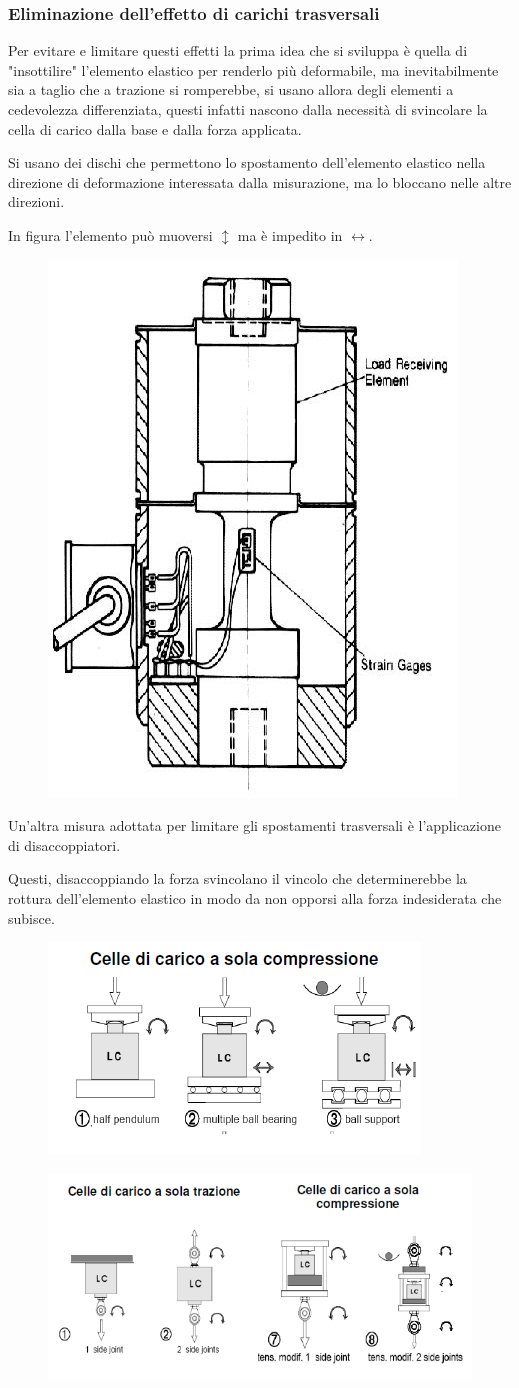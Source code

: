 \documentclass[a4paper, 15pt]{article}
\begin{document}
\subsubsection{Eliminazione dell'effetto di carichi trasversali}		
\begin{adjustwidth}{2in}{}	
	 	Per evitare e limitare questi effetti la prima idea che si sviluppa è quella di "insottilire" l'elemento elastico per renderlo più deformabile, ma inevitabilmente sia a taglio che a trazione si romperebbe, si usano allora degli elementi a cedevolezza differenziata, questi infatti nascono dalla necessità di svincolare la cella di carico dalla base e dalla forza applicata. \newline 
	 	
	 	Si usano dei dischi che permettono lo spostamento dell'elemento elastico nella direzione di deformazione interessata dalla misurazione, ma lo bloccano nelle altre direzioni. 
	 	
	 	In figura l'elemento può muoversi $\updownarrow$ ma è impedito in $\leftrightarrow$. 
\begin{figure}[H]
	\centering
	\includegraphics[width=0.2\linewidth]{immagini/10}
	\label{fig:10}
\end{figure}
\newpage
	 	Un'altra misura adottata per limitare gli spostamenti trasversali è l'applicazione di disaccoppiatori. 
	 	
	 	Questi, disaccoppiando la forza svincolano il vincolo che determinerebbe la rottura dell'elemento elastico in modo da non opporsi alla forza indesiderata che subisce. 
	 	
	 	\begin{figure}[H]
	 		\centering
	 		\includegraphics[width=0.5\linewidth]{immagini/screenshot004}
	 		\label{fig:screenshot004}
	 	\end{figure}	 	 
	 	\begin{figure}[H]
	 		\centering
	 		\includegraphics[width=0.5\linewidth]{immagini/screenshot005}
	 		\label{fig:screenshot005}
	 	\end{figure}
\end{adjustwidth}
\end{document}
